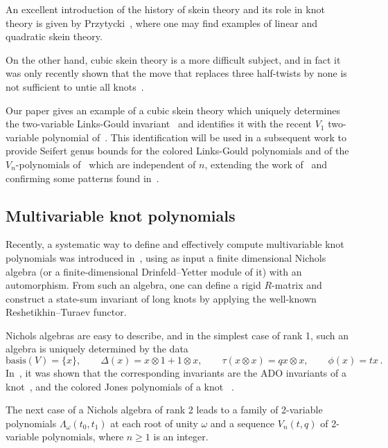 \documentclass[12pt,reqno]{amsart}
\theoremstyle{definition}
\def\be{\begin{equation}}
\def\ee{\end{equation}}
\begin{document}
An excellent introduction of the history of skein theory and its role in knot theory
is given by Przytycki~\cite{Prz:skein}, where one may find examples of linear and
quadratic skein theory.

On the other hand, cubic skein theory is a more difficult subject, and in fact it was
only recently shown that the move that replaces three half-twists by
none is not sufficient to untie all knots~\cite{BCGIKMMPW}.

Our paper gives an example of a cubic skein theory which uniquely determines the
two-variable Links-Gould invariant~\cite{LG} and identifies it with the recent
$V_1$ two-variable polynomial of~\cite{GK:multi}. This identification will be used
in a subsequent work to provide Seifert genus bounds for the colored Links-Gould
polynomials and of the $V_n$-polynomials of~\cite{GK:multi} which are independent of $n$,
extending the work of~\cite{KT} and confirming some patterns found
in~\cite{GL:patterns}.

\subsection{Multivariable knot polynomials}

Recently, a systematic way to define and effectively compute multivariable knot
polynomials was introduced in~\cite{GK:multi}, using as input a finite dimensional
Nichols algebra (or a finite-dimensional Drinfeld--Yetter module of it)
with an automorphism. From such an algebra, one can define a rigid $R$-matrix and
construct a state-sum invariant of long knots by applying the well-known
Reshetikhin--Turaev functor.

Nichols algebras are easy to describe, and 
in the simplest case of rank 1, such an algebra is uniquely determined by the
data
\be
\text{basis}(V)=\{x\}, \qquad \Delta(x)=x \otimes 1 + 1 \otimes x,
\qquad \tau(x\otimes x)=q x\otimes x,
\qquad \phi(x)=t x \,.
\ee
In~\cite{GK:multi}, it was shown that the corresponding invariants are the ADO
invariants of a knot~\cite{ADO}, and the colored Jones polynomials of a knot
~\cite{RT,Tu:YB}.

The next case of a Nichols algebra of rank 2 leads to a family of 2-variable
polynomials $\Lambda_\omega(t_0,t_1)$ at each root of unity $\omega$ and a
sequence $V_n(t,q)$ of 2-variable polynomials, where $n \geq 1$ is an integer. 
\end{document}
